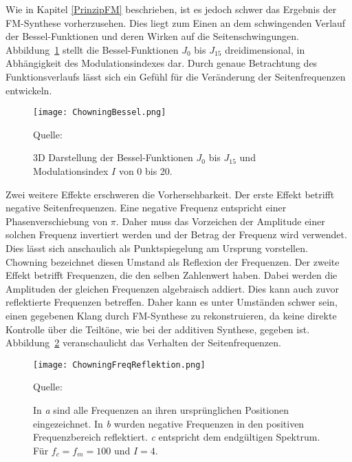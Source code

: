 Wie in Kapitel \glqq \ref{PrinzipFM} \grqq{} beschrieben, ist es jedoch schwer das Ergebnis der FM-Synthese vorherzusehen. Dies liegt zum Einen an dem schwingenden Verlauf der Bessel-Funktionen und deren Wirken auf die Seitenschwingungen. Abbildung~\ref{fig:bessel3D} stellt die Bessel-Funktionen $J_0$ bis $J_{15}$ dreidimensional, in Abhängigkeit des Modulationsindexes dar.
Durch genaue Betrachtung des Funktionsverlaufs lässt sich ein Gefühl für die Veränderung der Seitenfrequenzen entwickeln.

\begin{figure} [ht]
\centering
  \texttt{[image: ChowningBessel.png]}
\caption{3D Darstellung der Bessel-Funktionen $J_0$ bis $J_{15}$ und Modulationsindex $I$ von 0 bis 20. }
\label{fig:bessel3D}
Quelle: \cite{chowningPaper}
\end{figure}
\FloatBarrier

Zwei weitere Effekte erschweren die Vorhersehbarkeit. Der erste Effekt betrifft negative Seitenfrequenzen. Eine negative Frequenz entspricht einer Phasenverschiebung von $\pi$. Daher muss das Vorzeichen der Amplitude einer solchen Frequenz invertiert werden und der Betrag der Frequenz wird verwendet. Dies lässt sich anschaulich als Punktspiegelung am Ursprung vorstellen. Chowning bezeichnet diesen Umstand als Reflexion der Frequenzen. Der zweite Effekt betrifft Frequenzen, die den selben Zahlenwert haben. Dabei werden die Amplituden der gleichen Frequenzen algebraisch addiert. Dies kann auch zuvor reflektierte Frequenzen betreffen. Daher kann es unter Umständen schwer sein, einen gegebenen Klang durch FM-Synthese zu rekonstruieren, da keine direkte Kontrolle über die Teiltöne, wie bei der additiven Synthese, gegeben ist. Abbildung~\ref{fig:chowningFreqReflektion} veranschaulicht das Verhalten der Seitenfrequenzen.

\begin{figure} [ht]
\centering
  \texttt{[image: ChowningFreqReflektion.png]}
\caption{In \textit{a} sind alle Frequenzen an ihren ursprünglichen Positionen eingezeichnet. In \textit{b} wurden negative Frequenzen in den positiven Frequenzbereich reflektiert. \textit{c} entspricht dem endgültigen Spektrum. Für $f_c=f_m=100$ und $I=4$.}
\label{fig:chowningFreqReflektion}
Quelle: \cite{chowningPaper}
\end{figure}
\FloatBarrier




\FloatBarrier
